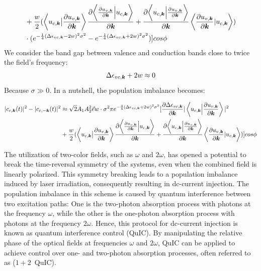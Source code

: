 \begin{equation}
\begin{aligned}
    &+\frac{w}{2} (\left \langle u_{c,\boldsymbol k} \big | \frac{\partial u_{v,\boldsymbol k}}{\partial \boldsymbol k}  \right \rangle \frac{\partial{\left \langle\frac{\partial u_{v,\boldsymbol k}}{\partial \boldsymbol k}\Big |u_{c,\boldsymbol k}\right \rangle}}{\partial {\boldsymbol k}} +
   \frac{\partial{\left \langle u_{c,\boldsymbol k}\Big |\frac{\partial u_{v,\boldsymbol k}}{\partial \boldsymbol k} \right \rangle}}{\partial {\boldsymbol k}}
    \left \langle \frac{\partial u_{v,\boldsymbol k}}{\partial \boldsymbol k} |  u_{c,\boldsymbol k} \right \rangle)\\
    &\cdot(e^{-\frac{1}{4}(\Delta \epsilon_{vc,\boldsymbol k} - 2w)^2 \sigma^2}
    -e^{-\frac{1}{4}(\Delta \epsilon_{vc,\boldsymbol k} + 2w)^2 \sigma^2})]cos\phi
    \end{aligned}
\end{equation}
We consider the band gap between valence and conduction bands close to twice the field's frequency:
\begin{align}
\Delta \epsilon_{vc,\boldsymbol k}+2w\approx0    
\end{align}
Because $\sigma\gg 0$. In a nutshell, the population imbalance becomes:

\begin{equation}
    \begin{aligned}
 |c_{c,\boldsymbol k}(t)|^2-|c_{c,-\boldsymbol k}(t)|^2&\approx\sqrt{2} A_1 A_2^2 \vec e w \cdot \sigma^2 \pi e^{-\frac{3}{4}(\Delta \epsilon_{vc,\boldsymbol k} + 2w)^2 \sigma^2}[\frac{\partial  \Delta \epsilon_{vc,\boldsymbol k}}{\partial \boldsymbol k} |\left \langle u_{c,\boldsymbol k}\Big |\frac{\partial u_{v,\boldsymbol k}}{\partial \boldsymbol k} \right \rangle|^2 \\
    &+\frac{w}{2} (\left \langle u_{c,\boldsymbol k} \big | \frac{\partial u_{v,\boldsymbol k}}{\partial \boldsymbol k}  \right \rangle \frac{\partial{\left \langle\frac{\partial u_{v,\boldsymbol k}}{\partial \boldsymbol k}\Big |u_{c,\boldsymbol k}\right \rangle}}{\partial {\boldsymbol k}} +
   \frac{\partial{\left \langle u_{c,\boldsymbol k}\Big |\frac{\partial u_{v,\boldsymbol k}}{\partial \boldsymbol k} \right \rangle}}{\partial {\boldsymbol k}}
    \left \langle \frac{\partial u_{v,\boldsymbol k}}{\partial \boldsymbol k} |  u_{c,\boldsymbol k} \right \rangle)]cos\phi
    \end{aligned}
\label{perturbationresult}
\end{equation}

The utilization of two-color fields, such as  $\omega$ and  $2\omega$, has opened a potential to break the time-reversal symmetry of the systems, even when the combined field is linearly polarized. This symmetry breaking leads to a population imbalance induced by laser irradiation, consequently resulting in dc-current injection. The population imbalance in this scheme is caused by quantum interference between two excitation paths: One is the two-photon absorption process with photons at the frequency  $\omega$, while the other is the one-photon absorption process with photons at the frequency  $2\omega$. Hence, this protocol for dc-current injection is known as quantum interference control (\gls{QuIC}). By manipulating the relative phase of the optical fields at frequencies  $\omega$ and $2\omega$, \gls{QuIC} can be applied to achieve control over one- and two-photon absorption processes, often referred to as ($1+2$~QuIC).

